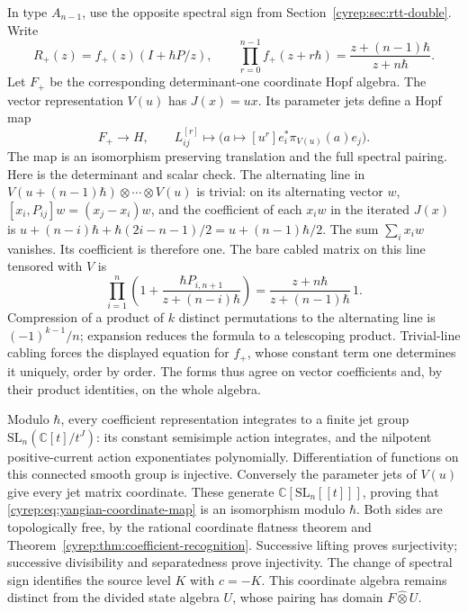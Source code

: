 In type \(A_{n-1}\), use the opposite spectral sign from
Section~\ref{cyrep:sec:rtt-double}. Write
\[
 R_+(z)=f_+(z)(I+\hbar P/z),\qquad
 \prod_{r=0}^{n-1}f_+(z+r\hbar)
                      =\frac{z+(n-1)\hbar}{z+n\hbar}.
\]
Let \(F_+\) be the corresponding determinant-one coordinate
Hopf algebra. The vector representation \(V(u)\) has \(J(x)=ux\).
Its parameter jets define a Hopf map
\begin{equation}\label{cyrep:eq:yangian-coordinate-map}
 F_+\longrightarrow H,\qquad
 L_{ij}^{[r]}\longmapsto
       \bigl(a\longmapsto[u^r]e_i^*\pi_{V(u)}(a)e_j\bigr).
\end{equation}
The map is an isomorphism preserving translation and the full
spectral pairing. Here is the determinant and scalar check.
The alternating line in
\(V(u+(n-1)\hbar)\otimes\cdots\otimes V(u)\)
is trivial: on its alternating vector \(w\),
\([x_i,P_{ij}]w=(x_j-x_i)w\), and the coefficient of each
\(x_iw\) in the iterated \(J(x)\) is
\(u+(n-i)\hbar+\hbar(2i-n-1)/2=u+(n-1)\hbar/2\).
The sum \(\sum_i x_iw\) vanishes. Its coefficient is therefore one.
The bare cabled matrix on this line tensored with \(V\) is
\[
 \prod_{i=1}^n\left(1+\frac{\hbar P_{i,n+1}}{z+(n-i)\hbar}\right)
       =\frac{z+n\hbar}{z+(n-1)\hbar}\,1.
\]
Compression of a product of \(k\) distinct permutations to the
alternating line is \((-1)^{k-1}/n\); expansion reduces the
formula to a telescoping product. Trivial-line cabling forces the
displayed equation for \(f_+\), whose constant term one determines
it uniquely, order by order. The forms thus agree on vector
coefficients and, by their product identities, on the whole algebra.

Modulo \(\hbar\), every coefficient representation integrates to
a finite jet group \(\mathrm{SL}_n(\mathbb C[t]/t^J)\): its constant
semisimple action integrates, and the nilpotent positive-current
action exponentiates polynomially. Differentiation of functions on
this connected smooth group is injective. Conversely the parameter
jets of \(V(u)\) give every jet matrix coordinate. These generate
\(\mathbb C[\mathrm{SL}_n[[t]]]\), proving that
\eqref{cyrep:eq:yangian-coordinate-map} is an isomorphism modulo
\(\hbar\). Both sides are topologically free, by the rational
coordinate flatness theorem \cite[\S1.5]{EtingofKazhdanIV} and
Theorem~\ref{cyrep:thm:coefficient-recognition}.
Successive lifting proves surjectivity; successive divisibility
and separatedness prove injectivity. The change of spectral sign
identifies the source level \(K\) with \(c=-K\).
This coordinate algebra remains distinct from the divided state
algebra \(U\), whose pairing has domain \(F\widehat\otimes U\).

